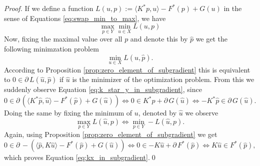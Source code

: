     \begin{proof}
        If we define a function $L(u, p) := \langle K^{\ast}p, u \rangle - F^{\ast}(p) + G(u)$ in the sense of Equations \ref{eq:swap_min_to_max}, we have
            $$
                \max_{p \in Y} \min_{u \in X} L(u, p)
            $$
        Now, fixing the maximal value over all $p$ and denote this by $\hat{p}$ we get the following minimzation problem
            $$
                \min_{u \in X} L(u, \hat{p}).
            $$
        According to Proposition \ref{prop:zero_element_of_subgradient} this is equivalent to $0 \in \partial\,L(\hat{u}, \hat{p})$ if $\hat{u}$ is the minimizer of the optimization problem. From this we suddenly observe Equation \ref{eq:k_star_y_in_subgradient}, since
            $$
                0 \in \partial \, (\langle K^{\ast}\hat{p}, \hat{u} \rangle - F^{\ast}(\hat{p}) + G(\hat{u})) \Longleftrightarrow 0 \in K^{\ast}\hat{p} + \partial \, G(\hat{u}) \Longleftrightarrow -K^{\ast}\hat{p} \in \partial \, G(\hat{u}).
            $$
        Doing the same by fixing the minimum of $u$, denoted by $\hat{u}$ we observe
            $$
                \max_{p \in Y} L(\hat{u}, p) \Longleftrightarrow \min_{p \in Y} -L(\hat{u}, p).
            $$
        Again, using Proposition \ref{prop:zero_element_of_subgradient} we get
            $$
                0 \in \partial \, -(\langle \hat{p}, K\hat{u} \rangle - F^{\ast}(\hat{p}) + G(\hat{u})) \Longleftrightarrow 0 \in -K\hat{u} + \partial \, F^{\ast}(\hat{p}) \Longleftrightarrow K\hat{u} \in F^{\ast}(\hat{p}),
            $$
        which proves Equation \ref{eq:kx_in_subgradient}.\qed
    \end{proof}

